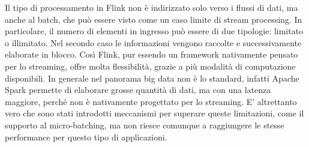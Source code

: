 Il tipo di processamento in Flink non è indirizzato solo verso i flussi di dati, ma anche al batch, che può essere visto come un caso limite di stream processing. In particolare, il numero di elementi in ingresso può essere di due tipologie: limitato o illimitato. Nel secondo caso le informazioni vengono raccolte e successivamente elaborate in blocco. Così Flink, pur essendo un framework nativamente pensato per lo streaming, offre molta flessibilità, grazie a più modalità di computazione disponibili. In generale nel panorama big data non è lo standard, infatti Apache Spark permette di elaborare grosse quantità di dati, ma con una latenza maggiore, perché non è nativamente progettato per lo streaming. E' altrettanto vero che sono stati introdotti meccanismi per superare queste limitazioni, come il supporto al micro-batching, ma non riesce comunque a raggiungere le stesse performance per questo tipo di applicazioni.





